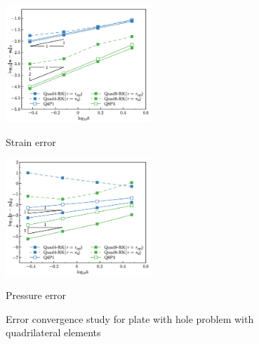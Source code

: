 \begin{figure}[!htp]
\centering
\begin{subcaptiongroup}
\centering
\parbox[b]{0.49\textwidth}{
    \includegraphics[width=0.49\textwidth]{plate_with_hole_quad_Hdev.png}
    \caption{Strain error}\label{fg:plate_with_hole_convergence_strain_quad}
}
\parbox[b]{0.49\textwidth}{
    \includegraphics[width=0.49\textwidth]{plate_with_hole_quad_L2_p.png}
    \caption{Pressure error}\label{fg:plate_with_hole_convergence_pressure_quad}
}
\end{subcaptiongroup}
\caption{Error convergence study for plate with hole problem with quadrilateral elements}\label{fg:plate_with_hole_convergence_quad}
\end{figure}

